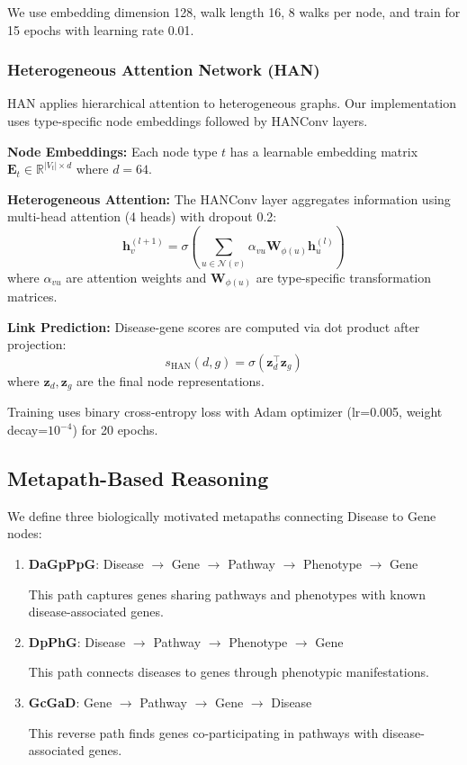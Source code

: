 \documentclass[11pt]{article}
\newcommand{\vect}[1]{\mathbf{#1}}
\newcommand{\mat}[1]{\mathbf{#1}}
\newcommand{\set}[1]{\mathcal{#1}}
\newcommand{\real}{\mathbb{R}}
\begin{document}
We use embedding dimension 128, walk length 16, 8 walks per node, and train for 15 epochs with learning rate 0.01.

\subsubsection{Heterogeneous Attention Network (HAN)}

HAN \citep{wang2019heterogeneous} applies hierarchical attention to heterogeneous graphs. Our implementation uses type-specific node embeddings followed by HANConv layers.

\textbf{Node Embeddings:} Each node type $t$ has a learnable embedding matrix $\mat{E}_t \in \real^{|V_t| \times d}$ where $d = 64$.

\textbf{Heterogeneous Attention:} The HANConv layer aggregates information using multi-head attention (4 heads) with dropout 0.2:
\begin{equation}
    \vect{h}_v^{(l+1)} = \sigma\left(\sum_{u \in \set{N}(v)} \alpha_{vu} \mat{W}_{\phi(u)} \vect{h}_u^{(l)}\right)
\end{equation}
where $\alpha_{vu}$ are attention weights and $\mat{W}_{\phi(u)}$ are type-specific transformation matrices.

\textbf{Link Prediction:} Disease-gene scores are computed via dot product after projection:
\begin{equation}
    s_{\text{HAN}}(d, g) = \sigma\left(\vect{z}_d^\top \vect{z}_g\right)
\end{equation}
where $\vect{z}_d, \vect{z}_g$ are the final node representations.

Training uses binary cross-entropy loss with Adam optimizer (lr=0.005, weight decay=$10^{-4}$) for 20 epochs.

\subsection{Metapath-Based Reasoning}
\label{sec:metapath}

We define three biologically motivated metapaths connecting Disease to Gene nodes:

\begin{enumerate}
    \item \textbf{DaGpPpG}: Disease $\rightarrow$ Gene $\rightarrow$ Pathway $\rightarrow$ Phenotype $\rightarrow$ Gene

    This path captures genes sharing pathways and phenotypes with known disease-associated genes.

    \item \textbf{DpPhG}: Disease $\rightarrow$ Pathway $\rightarrow$ Phenotype $\rightarrow$ Gene

    This path connects diseases to genes through phenotypic manifestations.

    \item \textbf{GcGaD}: Gene $\rightarrow$ Pathway $\rightarrow$ Gene $\rightarrow$ Disease

    This reverse path finds genes co-participating in pathways with disease-associated genes.
\end{enumerate}
\end{document}
